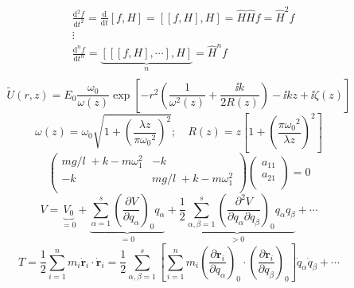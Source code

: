 \documentclass[english,log-declarations=false]{article}
\begin{document}
\[\begin{split}
& \frac{{{\text{d}}^{2}}f}{\text{d}{{t}^{2}}}=\frac{\text{d}}{\text{d}t}\left[ f,H \right]=\left[ \left[ f,H \right],H \right]=\hat{H}\hat{H}f={{{\hat{H}}}^{2}}f \\ 
& \vdots  \\ 
& \frac{{{\text{d}}^{n}}f}{\text{d}{{t}^{n}}}=\underbrace{\left[ \left[ \left[ f,H \right],\cdots  \right],H \right]}_{n}={{{\hat{H}}}^{n}}f  \\
\end{split}\]
\[\tilde{U}(r,z)=E_0\dfrac{\omega_0}{\omega(z)}\exp\left[-r^2\left(\dfrac{1}{\omega^2(z)}+\dfrac{\ii k}{2R(z)}\right)-\ii k z+\ii \zeta(z)\right]\]
\[\omega(z)=\omega_0\sqrt{1+\left(\dfrac{\lambda z}{\pi {\omega_0}^2}\right)^2};\quad R(z)=z\left[1+\left(\dfrac{\pi {\omega_0}^2}{\lambda z}\right)^2\right]\]
\[\left( \begin{matrix}
{mg}/{l}\;+k-m\omega _{1}^{2} & -k  \\
-k & {mg}/{l}\;+k-m\omega _{1}^{2}  \\
\end{matrix} \right)\left( \begin{matrix}
{{a}_{11}}  \\
{{a}_{21}}  \\
\end{matrix} \right)=0\]
\[V=\underbrace{{{V}_{0}}}_{=0}+\underbrace{\sum\limits_{\alpha =1}^{s}{{{\left( \frac{\partial V}{\partial {{q}_{\alpha }}} \right)}_{0}}{{q}_{\alpha }}}}_{=0}+\underbrace{\frac{1}{2}\sum\limits_{\alpha ,\beta =1}^{s}{{{\left( \frac{{{\partial }^{2}}V}{\partial {{q}_{\alpha }}\partial {{q}_{\beta }}} \right)}_{0}}{{q}_{\alpha }}{{q}_{\beta }}}}_{>0}+\cdots \]
\[T=\frac{1}{2}\sum\limits_{i=1}^{n}{{{m}_{i}}{{{\dot{\bm r}}}_{i}}\cdot {{{\dot{\bm r}}}_{i}}}=\frac{1}{2}\sum\limits_{\alpha ,\beta =1}^{s}{\left[ \sum\limits_{i=1}^{n}{{{m}_{i}}{{\left( \frac{\partial {{\bm r}_{i}}}{\partial {{q}_{\alpha }}} \right)}_{0}}\cdot {{\left( \frac{\partial {{\bm r}_{i}}}{\partial {{q}_{\beta }}} \right)}_{0}}} \right]{{{\dot{q}}}_{\alpha }}{{{\dot{q}}}_{\beta }}}+\cdots \]
\end{document}
